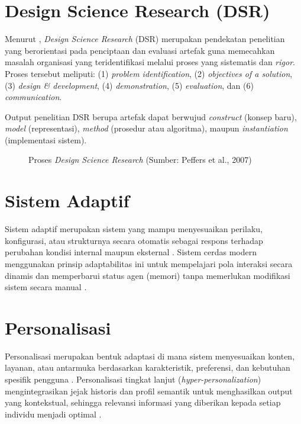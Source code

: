 \section{Design Science Research (DSR)}
Menurut \citet{Peffers2007}, \textit{Design Science Research}
(DSR) merupakan pendekatan penelitian yang berorientasi pada penciptaan dan evaluasi
artefak guna memecahkan masalah organisasi yang teridentifikasi melalui proses yang
sistematis dan \textit{rigor}. Proses tersebut meliputi: (1) \textit{problem identification},
(2) \textit{objectives of a solution}, (3) \textit{design \& development},
(4) \textit{demonstration}, (5) \textit{evaluation}, dan (6) \textit{communication}.

Output penelitian DSR berupa artefak dapat berwujud \textit{construct} (konsep baru),
\textit{model} (representasi), \textit{method} (prosedur atau algoritma), maupun
\textit{instantiation} (implementasi sistem).

\begin{figure}[H]
  \centering
  \caption{Proses \textit{Design Science Research} (Sumber: Peffers et al., 2007)}
  \label{fig:dsr}
\end{figure}

\section{Sistem Adaptif}
Sistem adaptif merupakan sistem yang mampu menyesuaikan perilaku, konfigurasi,
atau strukturnya secara otomatis sebagai respons terhadap perubahan kondisi internal
maupun eksternal \cite{Saputri2020}. Sistem cerdas modern menggunakan prinsip adaptabilitas
ini untuk mempelajari pola interaksi secara dinamis dan memperbarui status agen (memori) tanpa memerlukan modifikasi sistem secara manual \cite{Russell2021}.

\section{Personalisasi}
Personalisasi merupakan bentuk adaptasi di mana sistem menyesuaikan konten, layanan,
atau antarmuka berdasarkan karakteristik, preferensi, dan kebutuhan spesifik pengguna \cite{Benfarha2023}.
Personalisasi tingkat lanjut (\textit{hyper-personalization}) mengintegrasikan jejak historis
dan profil semantik untuk menghasilkan output yang kontekstual, sehingga relevansi
informasi yang diberikan kepada setiap individu menjadi optimal \cite{Adomavicius2005}.

